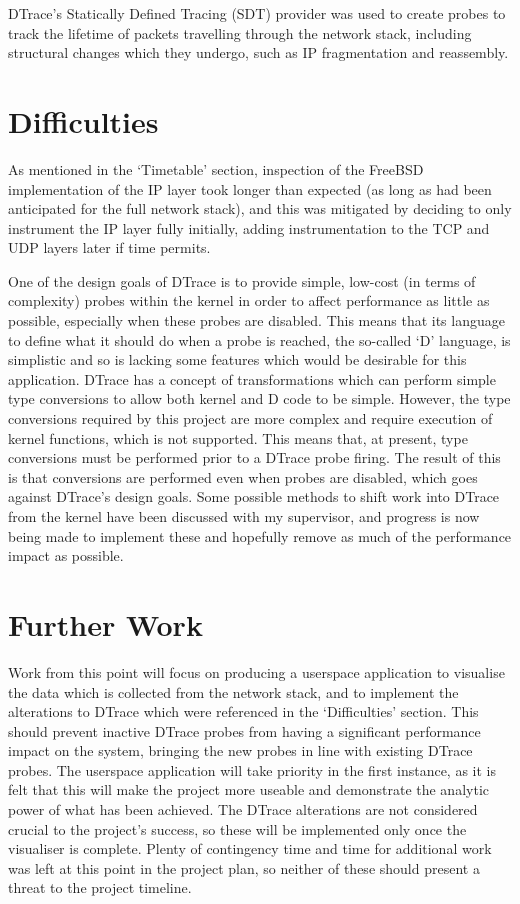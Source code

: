 \documentclass[a4paper,12pt,twoside,openright]{report}
\begin{document}
	DTrace's Statically Defined Tracing (SDT) provider was used to create probes to track the lifetime of packets travelling through the network stack, including structural changes which they undergo, such as IP fragmentation and reassembly.
	
	\section{Difficulties}
	
	As mentioned in the `Timetable' section, inspection of the FreeBSD implementation of the IP layer took longer than expected (as long as had been anticipated for the full network stack), and this was mitigated by deciding to only instrument the IP layer fully initially, adding instrumentation to the TCP and UDP layers later if time permits.
	
	One of the design goals of DTrace is to provide simple, low-cost (in terms of complexity) probes within the kernel in order to affect performance as little as possible, especially when these probes are disabled. This means that its language to define what it should do when a probe is reached, the so-called `D' language, is simplistic and so is lacking some features which would be desirable for this application. DTrace has a concept of transformations which can perform simple type conversions to allow both kernel and D code to be simple. However, the type conversions required by this project are more complex and require execution of kernel functions, which is not supported. This means that, at present, type conversions must be performed prior to a DTrace probe firing. The result of this is that conversions are performed even when probes are disabled, which goes against DTrace's design goals. Some possible methods to shift work into DTrace from the kernel have been discussed with my supervisor, and progress is now being made to implement these and hopefully remove as much of the performance impact as possible.
	
	\section{Further Work}
	
	Work from this point will focus on producing a userspace application to visualise the data which is collected from the network stack, and to implement the alterations to DTrace which were referenced in the `Difficulties' section. This should prevent inactive DTrace probes from having a significant performance impact on the system, bringing the new probes in line with existing DTrace probes. The userspace application will take priority in the first instance, as it is felt that this will make the project more useable and demonstrate the analytic power of what has been achieved. The DTrace alterations are not considered crucial to the project's success, so these will be implemented only once the visualiser is complete. Plenty of contingency time and time for additional work was left at this point in the project plan, so neither of these should present a threat to the project timeline.
	
\end{document}
